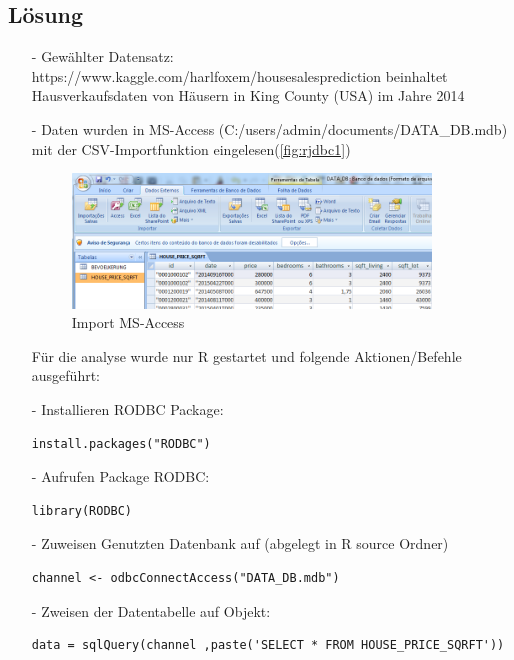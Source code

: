 \subsection*{Lösung}
\begin{itemize}
\item[-]Gewählter Datensatz: https://www.kaggle.com/harlfoxem/housesalesprediction beinhaltet Hausverkaufsdaten von Häusern in King County (USA) im Jahre 2014
\item[-]Daten wurden in MS-Access (C:/users/admin/documents/DATA\_DB.mdb) mit der CSV-Importfunktion eingelesen(\autoref{fig:rjdbc1})
\begin{figure}[!htb]
        \begin{minipage}{1\textwidth}
                \centering
                \includegraphics[width=0.90\textwidth]{pics/rjdbc1.png}\par\vspace{0cm}
                \caption{Import MS-Access}
                \label{fig:rjdbc1}
        \end{minipage}
\end{figure}

Für die analyse wurde nur R gestartet und folgende Aktionen/Befehle ausgeführt:
\item[-]Installieren RODBC Package:
\begin{lstlisting}
install.packages("RODBC")
\end{lstlisting}
\item[-]Aufrufen Package RODBC:
\begin{lstlisting}
library(RODBC)
\end{lstlisting}
\item[-]Zuweisen Genutzten Datenbank auf (abgelegt in R source Ordner)
\begin{lstlisting}
channel <- odbcConnectAccess("DATA_DB.mdb")
\end{lstlisting}

\item[-]Zweisen der Datentabelle auf Objekt:
\begin{lstlisting}
data = sqlQuery(channel ,paste('SELECT * FROM HOUSE_PRICE_SQRFT'))
\end{lstlisting}


\end{itemize}
